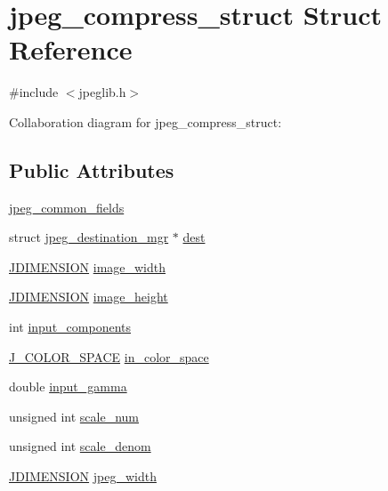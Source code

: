 \hypertarget{structjpeg__compress__struct}{}\section{jpeg\+\_\+compress\+\_\+struct Struct Reference}
\label{structjpeg__compress__struct}


{\ttfamily \#include $<$jpeglib.\+h$>$}



Collaboration diagram for jpeg\+\_\+compress\+\_\+struct\+:
\subsection*{Public Attributes}
\begin{DoxyCompactItemize}
\item 
\hyperlink{structjpeg__compress__struct_a831013770bec36f77dd2048c8771513c}{jpeg\+\_\+common\+\_\+fields}
\item 
struct \hyperlink{structjpeg__destination__mgr}{jpeg\+\_\+destination\+\_\+mgr} $\ast$ \hyperlink{structjpeg__compress__struct_ab31c2c756e309dee8d0318557353ba40}{dest}
\item 
\hyperlink{jmorecfg_8h_a04ed4674f6f1d0d50ec241531e38274f}{J\+D\+I\+M\+E\+N\+S\+I\+O\+N} \hyperlink{structjpeg__compress__struct_ac8e50a2c70252c53f3e10b886818f2cf}{image\+\_\+width}
\item 
\hyperlink{jmorecfg_8h_a04ed4674f6f1d0d50ec241531e38274f}{J\+D\+I\+M\+E\+N\+S\+I\+O\+N} \hyperlink{structjpeg__compress__struct_a30863835e7785b7df800811f842b2da0}{image\+\_\+height}
\item 
int \hyperlink{structjpeg__compress__struct_af5b66b039ea5a96bb2f5cf0254115837}{input\+\_\+components}
\item 
\hyperlink{jpeglib_8h_a6ea40239360b06efe6377f125f1134f3}{J\+\_\+\+C\+O\+L\+O\+R\+\_\+\+S\+P\+A\+C\+E} \hyperlink{structjpeg__compress__struct_ac27d1dfbbbd677aab9fb570c58ca960d}{in\+\_\+color\+\_\+space}
\item 
double \hyperlink{structjpeg__compress__struct_ac5d2e16382ea12fb4e3bd6a69f7831ea}{input\+\_\+gamma}
\item 
unsigned int \hyperlink{structjpeg__compress__struct_a16eb7e2e1ac30c42e8bd753bde43129c}{scale\+\_\+num}
\item 
unsigned int \hyperlink{structjpeg__compress__struct_ab30f569483d6c25032aa2c18c885e91c}{scale\+\_\+denom}
\item 
\hyperlink{jmorecfg_8h_a04ed4674f6f1d0d50ec241531e38274f}{J\+D\+I\+M\+E\+N\+S\+I\+O\+N} \hyperlink{structjpeg__compress__struct_ab433b317fcbe32212122621e476ac9d8}{jpeg\+\_\+width}

\end{DoxyCompactItemize}
